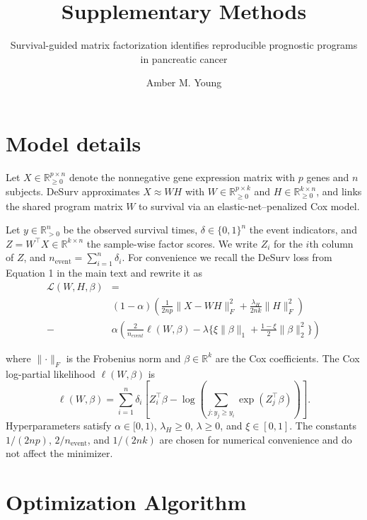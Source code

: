 \documentclass[
]{article}
\title{Supplementary Methods}
\subtitle{Survival-guided matrix factorization identifies reproducible
prognostic programs in pancreatic cancer}
\author{Amber M. Young}
\date{}
\begin{document}
\maketitle

{
\setcounter{tocdepth}{2}
\tableofcontents
}
\section{Model details}

Let \(X \in \mathbb{R}_{\ge 0}^{p \times n}\) denote the nonnegative
gene expression matrix with \(p\) genes and \(n\) subjects. DeSurv
approximates \(X \approx WH\) with
\(W \in \mathbb{R}_{\ge 0}^{p \times k}\) and
\(H \in \mathbb{R}_{\ge 0}^{k \times n}\), and links the shared program
matrix \(W\) to survival via an elastic-net--penalized Cox model.

Let \(y \in \mathbb{R}^n_{> 0}\) be the observed survival times,
\(\delta \in \{0,1\}^n\) the event indicators, and
\(Z = W^\top X \in \mathbb{R}^{k \times n}\) the sample-wise factor
scores. We write \(Z_i\) for the \(i\)th column of \(Z\), and
\(n_{\text{event}} = \sum_{i=1}^n \delta_i\). For convenience we recall
the DeSurv loss from Equation 1 in the main text and rewrite it as
\begin{align}
  \mathcal{L}(W,H,\beta) &=\nonumber \\
  &(1-\alpha)\left(\frac{1}{2np}\lVert X - WH \rVert_F^2 + \frac{\lambda_H}{2nk} \lVert H \rVert_F^2\right) \nonumber \\
  -&\alpha \left(\frac{2}{n_{event}}\ell(W,\beta) - \lambda \{ \xi \lVert \beta \rVert_1 + \tfrac{1-\xi}{2} \lVert \beta \rVert_2^2 \} \right) \nonumber
\end{align}

where \(\lVert \cdot \rVert_F\) is the Frobenius norm and
\(\beta \in \mathbb{R}^k\) are the Cox coefficients. The Cox log-partial
likelihood \(\ell(W,\beta)\) is \begin{equation}
\ell(W,\beta)
=
\sum_{i=1}^n
\delta_i
\left[
  Z_i^\top \beta
  -
  \log \left(
    \sum_{j : y_j \ge y_i}
    \exp(Z_j^\top \beta)
  \right)
\right].
\end{equation} Hyperparameters satisfy \(\alpha \in [0,1)\),
\(\lambda_H \ge 0\), \(\lambda \ge 0\), and \(\xi \in [0,1]\). The
constants \(1/(2np)\), \(2/n_{\text{event}}\), and \(1/(2nk)\) are
chosen for numerical convenience and do not affect the minimizer.

\section{Optimization Algorithm}
\end{document}
